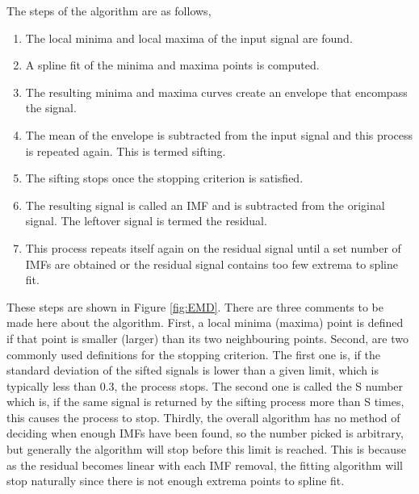     The steps of the algorithm are as follows,
    \begin{enumerate}
        \item The local minima and local maxima of the input signal are found.
        \item A spline fit of the minima and maxima points is computed.
        \item The resulting minima and maxima curves create an envelope that encompass the signal.
        \item The mean of the envelope is subtracted from the input signal and this process is repeated again. This is termed sifting.
        \item The sifting stops once the stopping criterion is satisfied.
        \item The resulting signal is called an IMF and is subtracted from the original signal. The leftover signal is termed the residual.
        \item This process repeats itself again on the residual signal until a set number of IMFs are obtained or the residual signal contains too few extrema to spline fit.
    \end{enumerate}
    These steps are shown in Figure \ref{fig:EMD}.
    There are three comments to be made here about the algorithm.
    First, a local minima (maxima) point is defined if that point is smaller (larger) than its two neighbouring points.
    Second, are two commonly used definitions for the stopping criterion.
    The first one is, if the standard deviation of the sifted signals is lower than a given limit, which is typically less than 0.3, the process stops.
    The second one is called the S number which is, if the same signal is returned by the sifting process more than S times, this causes the process to stop.
    Thirdly, the overall algorithm has no method of deciding when enough IMFs have been found, so the number picked is arbitrary, but generally the algorithm will stop before this limit is reached.
    This is because as the residual becomes linear with each IMF removal, the fitting algorithm will stop naturally since there is not enough extrema points to spline fit.

